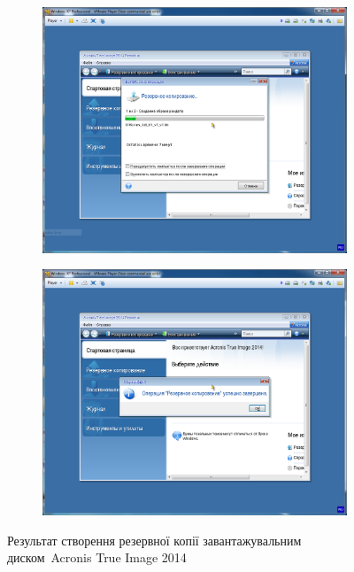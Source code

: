 \documentclass[
	a4paper,
	oneside,
	DIV = 12,
	fontsize = 13pt,
	headings = normal,
]{scrartcl}
\begin{document}
			\begin{figure}[!htbp]
				\centering
				\begin{subfigure}{0.5\columnwidth}
					\centering
					\includegraphics[height = 8\baselineskip]{./assets/y03s01-pcdiag-lab-04-p03.png}
					\caption{}
					\label{subfig:02-01-acronis-true-image-disk-backup-inprocess}
				\end{subfigure}%
				\begin{subfigure}{0.5\columnwidth}
					\centering
					\includegraphics[height = 8\baselineskip]{./assets/y03s01-pcdiag-lab-04-p04.png}
					\caption{}
					\label{subfig:02-01-acronis-true-image-disk-backup-res}
				\end{subfigure}%
				\caption{Результат створення резервної копії завантажувальним диском~\textenglish{Acronis True Image 2014}}
				\label{fig:02-acronis-true-image-disk-backup-res}
			\end{figure}
\end{document}
